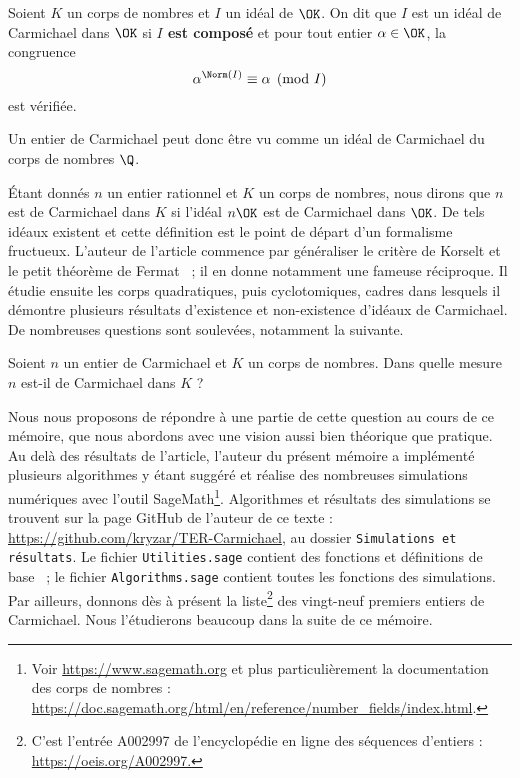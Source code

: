 \begin{definition} Soient $K$ un corps de nombres et $I$ un idéal de $\OK$. On dit que $I$ est un idéal de Carmichael dans $\OK$ si \textbf{$I$ est composé} et pour tout entier $\alpha \in \OK$, la congruence \[\alpha^{\Norm(I)} \equiv \alpha \pmod{I}\] est vérifiée.
\end{definition}

\begin{remarque}
	Un entier de Carmichael peut donc être vu comme un idéal de Carmichael du corps de nombres $\Q$.
\end{remarque}

Étant donnés $n$ un entier rationnel et $K$ un corps de nombres, nous dirons que $n$ est de Carmichael dans $K$ si l'idéal $n\OK$ est de Carmichael dans $\OK$. De tels idéaux existent et cette définition est le point de départ d'un formalisme fructueux. L'auteur de l'article commence par généraliser le critère de Korselt et le petit théorème de Fermat ~; il en donne notamment une fameuse réciproque. Il étudie ensuite les corps quadratiques, puis cyclotomiques, cadres dans lesquels il démontre plusieurs résultats d'existence et non-existence d'idéaux de Carmichael. De nombreuses questions sont soulevées, notamment la suivante. 

\begin{question}\label{question-centrale}Soient $n$ un entier de Carmichael et $K$ un corps de nombres. Dans quelle mesure $n$ est-il de Carmichael dans $K$ ?
\end{question}

Nous nous proposons de répondre à une partie de cette question au cours de ce mémoire, que nous abordons avec une vision aussi bien théorique que pratique. Au delà des résultats de l'article, l'auteur du présent mémoire a implémenté plusieurs algorithmes y étant suggéré et réalise des nombreuses simulations numériques avec l'outil SageMath\footnote{Voir \url{https://www.sagemath.org} et plus particulièrement la documentation des corps de nombres : \url{https://doc.sagemath.org/html/en/reference/number\_fields/index.html}.}. Algorithmes et résultats des simulations se trouvent sur la page GitHub de l'auteur de ce texte : \url{https://github.com/kryzar/TER-Carmichael}, au dossier \texttt{Simulations et résultats}. Le fichier \texttt{Utilities.sage} contient des fonctions et définitions de base ~; le fichier \texttt{Algorithms.sage} contient toutes les fonctions des simulations. Par ailleurs, donnons dès à présent la liste\footnote{C’est l'entrée A002997 de l'encyclopédie en ligne des séquences d’entiers : \url{https://oeis.org/A002997.}} des vingt-neuf premiers entiers de Carmichael. Nous l'étudierons beaucoup dans la suite de ce mémoire.

